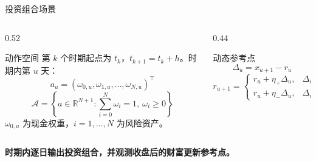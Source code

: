 \documentclass{beamer}
\newcommand{\smallcap}[1]{\textcolor{deepblue}{\textbf{#1}}}
\begin{document}
\begin{frame}{投资组合场景}
    \footnotesize
    \begin{columns}[T]
        \begin{column}{0.52\textwidth}
            \begin{block}{动作空间}
                第 $k$ 个时期起点为 $t_k$，$t_{k+1}=t_k+h$。时期内第 $u$ 天：
                \[
                a_u=(\omega_{0,u},\omega_{1,u},\ldots,\omega_{N,u})^\top
                \]
                \[
                \mathcal{A}=
                \left\{a\in \mathbb{R}^{N+1}:
                \sum_{i=0}^{N}\omega_i=1,\ \omega_i\ge 0
                \right\}
                \]
                $\omega_{0,u}$ 为现金权重，$i=1,\ldots,N$ 为风险资产。
            \end{block}
        \end{column}
        \begin{column}{0.44\textwidth}
            \begin{block}{动态参考点}
                \[
                \Delta_u=x_{u+1}-r_u
                \]
                \[
                r_{u+1}=
                \begin{cases}
                r_u+\eta_+\Delta_u, & \Delta_u\ge 0,\\
                r_u+\eta_-\Delta_u, & \Delta_u<0
                \end{cases}
                \]
            \end{block}
        \end{column}
    \end{columns}
    \vspace{0.4em}
    \begin{center}
        \smallcap{时期内逐日输出投资组合，并观测收盘后的财富更新参考点。}
    \end{center}
\end{frame}
\end{document}
